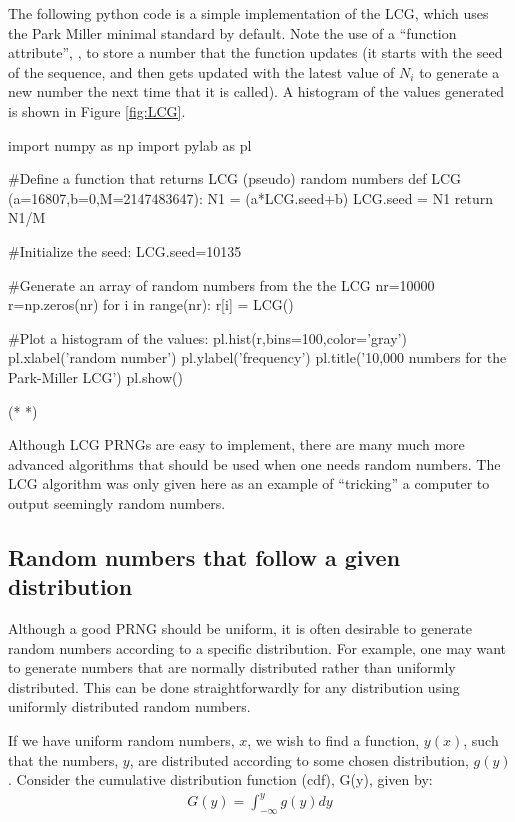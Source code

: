 The following python code is a simple implementation of the LCG, which uses the Park Miller minimal standard by default. Note the use of a ``function attribute'', , to store a number that the  function updates (it starts with the seed of the sequence, and then gets updated with the latest value of $N_i$ to generate a new number the next time that it is called). A histogram of the values generated is shown in Figure \ref{fig:LCG}.
\begin{python}[caption = Park-Miller minimal standard LCG] 
import numpy as np
import pylab as pl

#Define a function that returns LCG (pseudo) random numbers
def LCG (a=16807,b=0,M=2147483647):
    N1 = (a*LCG.seed+b) %
    LCG.seed = N1
    return N1/M

#Initialize the seed:
LCG.seed=10135

#Generate an array of random numbers from the the LCG
nr=10000
r=np.zeros(nr)
for i in range(nr):
    r[i] = LCG()

#Plot a histogram of the values:
pl.hist(r,bins=100,color='gray')
pl.xlabel('random number')
pl.ylabel('frequency')
pl.title('10,000 numbers for the Park-Miller LCG')
pl.show()
\end{python}
\begin{poutput}
(*  *)
\end{poutput}

Although LCG PRNGs are easy to implement, there are many much more advanced algorithms that should be used when one needs random numbers. The LCG algorithm was only given here as an example of ``tricking'' a computer to output seemingly random numbers.

\subsection{Random numbers that follow a given distribution}
Although a good PRNG should be uniform, it is often desirable to generate random numbers according to a specific distribution. For example, one may want to generate numbers that are normally distributed rather than uniformly distributed. This can be done straightforwardly for any distribution using uniformly distributed random numbers.

If we have uniform random numbers, $x$, we wish to find a function, $y(x)$, such that the numbers, $y$, are distributed according to some chosen distribution, $g(y)$. Consider the cumulative distribution function (cdf), G(y), given by:
\begin{align*}
G(y) = \int_{-\infty}^y g(y)dy
\end{align*}

